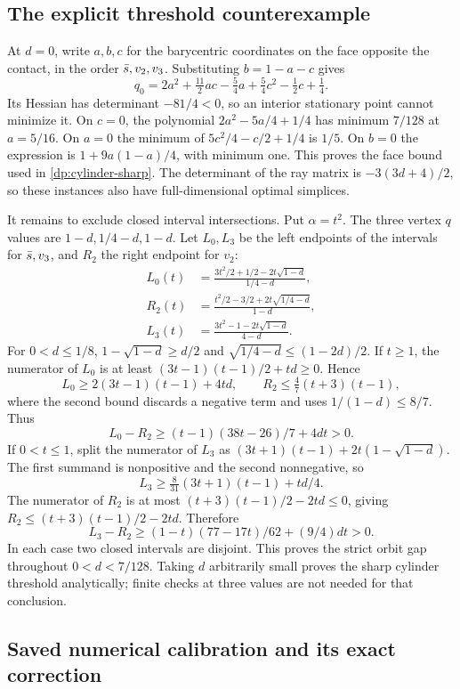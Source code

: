 \subsection{The explicit threshold counterexample}\label{dp:cylinder-sharp-proof}

At $d=0$, write $a,b,c$ for the barycentric coordinates on the face opposite
the contact, in the order $\bar s,v_2,v_3$. Substituting $b=1-a-c$ gives
\[
 q_0=2a^2+\tfrac{11}{2}ac-\tfrac54a+\tfrac54c^2-\tfrac12c+\tfrac14.
\]
Its Hessian has determinant $-81/4<0$, so an interior stationary point
cannot minimize it. On $c=0$, the polynomial
$2a^2-5a/4+1/4$ has minimum $7/128$ at $a=5/16$.
On $a=0$ the minimum of $5c^2/4-c/2+1/4$ is $1/5$.
On $b=0$ the expression is $1+9a(1-a)/4$, with minimum one.
This proves the face bound used in \cref{dp:cylinder-sharp}.
The determinant of the ray matrix is $-3(3d+4)/2$, so these instances also
have full-dimensional optimal simplices.

It remains to exclude closed interval intersections. Put $\alpha=t^2$.
The three vertex $q$ values are $1-d,1/4-d,1-d$. Let $L_0,L_3$ be the
left endpoints of the intervals for $\bar s,v_3$, and $R_2$ the right
endpoint for $v_2$:
\begin{align*}
 L_0(t)&=\frac{3t^2/2+1/2-2t\sqrt{1-d}}{1/4-d},\\
 R_2(t)&=\frac{t^2/2-3/2+2t\sqrt{1/4-d}}{1-d},\\
 L_3(t)&=\frac{3t^2-1-2t\sqrt{1-d}}{4-d}.
\end{align*}
For $0<d\le1/8$,
$1-\sqrt{1-d}\ge d/2$ and
$\sqrt{1/4-d}\le(1-2d)/2$.
If $t\ge1$, the numerator of $L_0$ is at least
$(3t-1)(t-1)/2+td\ge0$. Hence
\[
 L_0\ge2(3t-1)(t-1)+4td,\qquad
 R_2\le\tfrac47(t+3)(t-1),
\]
where the second bound discards a negative term and uses $1/(1-d)\le8/7$.
Thus
\[
 L_0-R_2\ge(t-1)(38t-26)/7+4dt>0.
\]
If $0<t\le1$, split the numerator of $L_3$ as
$(3t+1)(t-1)+2t(1-\sqrt{1-d})$.
The first summand is nonpositive and the second nonnegative, so
\[
 L_3\ge\tfrac8{31}(3t+1)(t-1)+td/4.
\]
The numerator of $R_2$ is at most
$(t+3)(t-1)/2-2td\le0$, giving
$R_2\le(t+3)(t-1)/2-2td$.
Therefore
\[
 L_3-R_2\ge(1-t)(77-17t)/62+(9/4)dt>0.
\]
In each case two closed intervals are disjoint. This proves the strict
orbit gap throughout $0<d<7/128$. Taking $d$ arbitrarily small proves
the sharp cylinder threshold analytically; finite checks at three values
are not needed for that conclusion.

\subsection{Saved numerical calibration and its exact correction}\label{dp:calibration}

